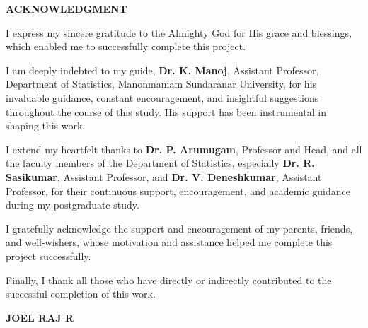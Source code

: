 \documentclass[11pt, a4paper, oneside, openright]{book}
\begin{document}
\thispagestyle{plain}
\begin{center}
	\normalsize 
	\textbf{ACKNOWLEDGMENT}

\end{center} {\doublespacing    
    \qquad I express my sincere gratitude to the Almighty God for His grace and blessings, which enabled me to successfully complete this project.
    
    I am deeply indebted to my guide, \textbf{Dr. K. Manoj}, Assistant Professor, Department of Statistics, Manonmaniam Sundaranar University, for his invaluable guidance, constant encouragement, and insightful suggestions throughout the course of this study. His support has been instrumental in shaping this work.
    
    I extend my heartfelt thanks to \textbf{Dr. P. Arumugam}, Professor and Head, and all the faculty members of the Department of Statistics, especially \linebreak \textbf{Dr. R. Sasikumar}, Assistant Professor, and \textbf{Dr. V. Deneshkumar}, Assistant Professor, for their continuous support, encouragement, and academic guidance during my postgraduate study.
    
    I gratefully acknowledge the support and encouragement of my parents, friends, and well-wishers, whose motivation and assistance helped me complete this project successfully.
    
    Finally, I thank all those who have directly or indirectly contributed to the successful completion of this work.
    
    \begin{flushright}
    	\textbf{JOEL RAJ R}
    \end{flushright}
}
\clearpage %
\end{document}
